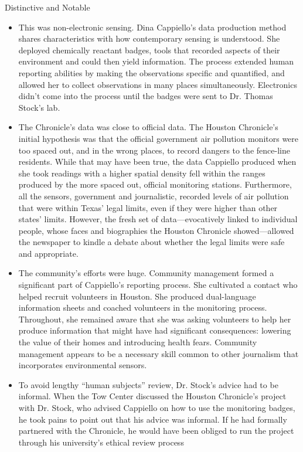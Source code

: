 Distinctive and Notable
\begin{itemize}
\item This was non-electronic sensing.
Dina Cappiello's data production method shares characteristics with
how contemporary sensing is understood. She deployed chemically
reactant badges, tools that recorded aspects of their environment and
could then yield information. The process extended human reporting
abilities by making the observations specific and quantified, and
allowed her to collect observations in many places simultaneously.
Electronics didn't come into the process until the badges were sent to
Dr. Thomas Stock's lab.
\item The Chronicle's data was close to official data.
The Houston Chronicle's initial hypothesis was that the official government
air pollution monitors were too spaced out, and in the wrong
places, to record dangers to the fence-line residents. While that may
have been true, the data Cappiello produced when she took readings
with a higher spatial density fell within the ranges produced by
the more spaced out, official monitoring stations. Furthermore, all
the sensors, government and journalistic, recorded levels of air pollution
that were within Texas' legal limits, even if they were higher
than other states' limits. However, the fresh set of data—evocatively
linked to individual people, whose faces and biographies the Houston
Chronicle showed—allowed the newspaper to kindle a debate about
whether the legal limits were safe and appropriate.
\item The community's efforts were huge.
Community management formed a significant part of Cappiello's
reporting process. She cultivated a contact who helped recruit volunteers
in Houston. She produced dual-language information sheets
and coached volunteers in the monitoring process. Throughout, she
remained aware that she was asking volunteers to help her produce
information that might have had significant consequences: lowering
the value of their homes and introducing health fears. Community
management appears to be a necessary skill common to other journalism
that incorporates environmental sensors.
\item To avoid lengthy ``human subjects'' review, Dr. Stock's advice
had to be informal.
When the Tow Center discussed the Houston Chronicle's project
with Dr. Stock, who advised Cappiello on how to use the monitoring
badges, he took pains to point out that his advice was informal.
If he had formally partnered with the Chronicle, he would have been
obliged to run the project through his university's ethical review process

\end{itemize}
